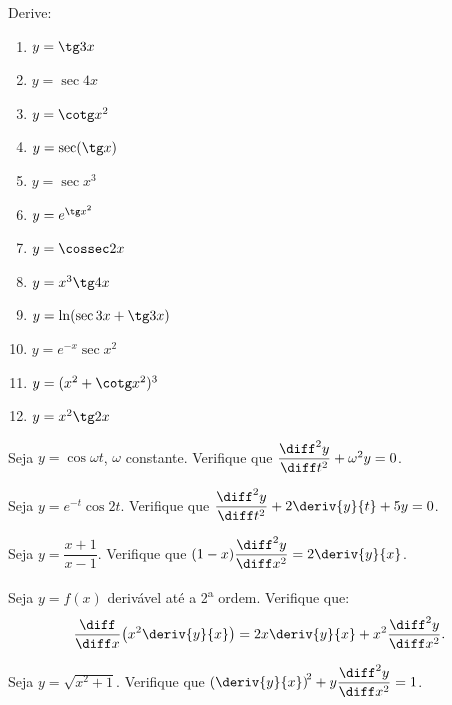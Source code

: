 \begin{exercicio}[16]
\label{ex:7.11.16}
Derive:
\begin{enumerate}[label=\alph*)]
    \item $y = \tg 3x$
    \item $y = \sec 4x$
    \item $y = \cotg x^2$
    \item $y = \sec(\tg x)$
    \item $y = \sec x^3$
    \item $y = e^{\tg x^2}$
    \item $y = \cossec 2x$
    \item $y = x^3 \tg 4x$
    \item $y = \ln(\sec 3x + \tg 3x)$
    \item $y = e^{-x}\sec x^2$
    \item $y = (x^2 + \cotg x^2)^3$
    \item $y = x^2 \tg 2x$
\end{enumerate}
\end{exercicio}

\begin{exercicio}[17]
\label{ex:7.11.17}
Seja $y = \cos \omega t$, $\omega$ constante. Verifique que $\dfrac{\diff^2 y}{\diff t^2} + \omega^2 y = 0$.
\end{exercicio}

\begin{exercicio}[18]
\label{ex:7.11.18}
Seja $y = e^{-t}\cos 2t$. Verifique que $\dfrac{\diff^2 y}{\diff t^2} + 2\deriv{y}{t} + 5y = 0$.
\end{exercicio}

\begin{exercicio}[19]
\label{ex:7.11.19}
Seja $y = \dfrac{x + 1}{x - 1}$. Verifique que $(1 - x)\dfrac{\diff^2 y}{\diff x^2} = 2\deriv{y}{x}$.
\end{exercicio}

\begin{exercicio}[20]
\label{ex:7.11.20}
Seja $y = f(x)$ derivável até a 2\textsuperscript{a} ordem. Verifique que:
\[
\frac{\diff}{\diff x}\!\left(x^2 \deriv{y}{x}\right) = 2x\deriv{y}{x} + x^2 \frac{\diff^2 y}{\diff x^2}.
\]
\end{exercicio}

\begin{exercicio}[21]
\label{ex:7.11.21}
Seja $y = \sqrt{x^2 + 1}$. Verifique que $\left(\deriv{y}{x}\right)^{\!2} + y\dfrac{\diff^2 y}{\diff x^2} = 1$.
\end{exercicio}

